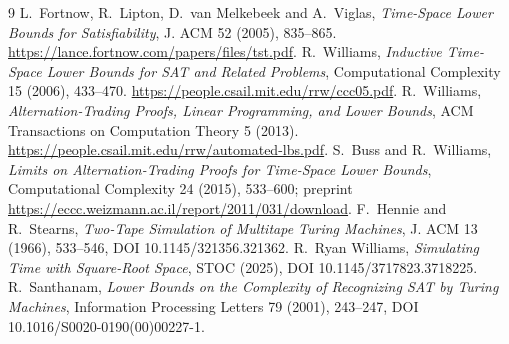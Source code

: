 \documentclass[11pt]{article}
\begin{document}
\begin{thebibliography}{9}\small
{} L.~Fortnow, R.~Lipton, D.~van Melkebeek and A.~Viglas, \emph{Time-Space Lower Bounds for Satisfiability}, J. ACM 52 (2005), 835--865. \url{https://lance.fortnow.com/papers/files/tst.pdf}.
 R.~Williams, \emph{Inductive Time-Space Lower Bounds for SAT and Related Problems}, Computational Complexity 15 (2006), 433--470. \url{https://people.csail.mit.edu/rrw/ccc05.pdf}.
 R.~Williams, \emph{Alternation-Trading Proofs, Linear Programming, and Lower Bounds}, ACM Transactions on Computation Theory 5 (2013). \url{https://people.csail.mit.edu/rrw/automated-lbs.pdf}.
 S.~Buss and R.~Williams, \emph{Limits on Alternation-Trading Proofs for Time-Space Lower Bounds}, Computational Complexity 24 (2015), 533--600; preprint \url{https://eccc.weizmann.ac.il/report/2011/031/download}.
 F.~Hennie and R.~Stearns, \emph{Two-Tape Simulation of Multitape Turing Machines}, J. ACM 13 (1966), 533--546, DOI 10.1145/321356.321362.
 R.~Ryan Williams, \emph{Simulating Time with Square-Root Space}, STOC (2025), DOI 10.1145/3717823.3718225.
 R.~Santhanam, \emph{Lower Bounds on the Complexity of Recognizing SAT by Turing Machines}, Information Processing Letters 79 (2001), 243--247, DOI 10.1016/S0020-0190(00)00227-1.
\end{thebibliography}
\end{document}
